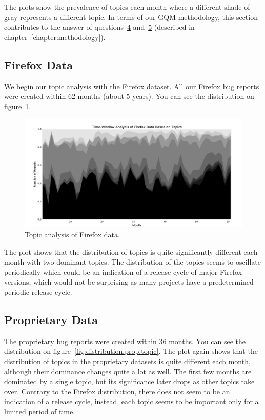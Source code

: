 The plots show the prevalence of topics each month where a different shade of gray represents a different topic. In terms of our GQM methodology, this section contributes to the answer of questions~\hyperlink{question:4}{4} and~\hyperlink{question:5}{5} (described in chapter~\ref{chapter:methodology}).

\subsection{Firefox Data}

We begin our topic analysis with the Firefox dataset. All our Firefox bug reports were created within 62 months (about 5 years). You can see the distribution on figure~\ref{fig:distribution.firefox.topic}.

\begin{figure}[htbp]
    \centering
        \includegraphics[width=\textwidth]{./images/topic_component_distribution/firefox_topic_10.pdf}
    \caption{Topic analysis of Firefox data.}
    \label{fig:distribution.firefox.topic}
\end{figure}

The plot shows that the distribution of topics is quite significantly different each month with two dominant topics. The distribution of the topics seems to oscillate periodically which could be an indication of a release cycle of major Firefox versions, which would not be surprising as many projects have a predetermined periodic release cycle.

\subsection{Proprietary Data}

The proprietary bug reports were created within 36 months. You can see the distribution on figure~\ref{fig:distribution.prop.topic}. The plot again shows that the distribution of topics in the proprietary datasets is quite different each month, although their dominance changes quite a lot as well. The first few months are dominated by a single topic, but its significance later drops as other topics take over. Contrary to the Firefox distribution, there does not seem to be an indication of a release cycle, instead, each topic seems to be important only for a limited period of time.

